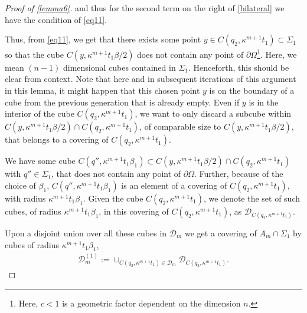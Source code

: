 \documentclass{article}
\newcounter{lem}
\theoremstyle{plain}
\theoremstyle{plain}
\newcommand{\en}{\beta_1}
\theoremstyle{definition}
\theoremstyle{plain}
\begin{document}
\begin{proof}[Proof of \cref{lemma6}]
and thus for the second term on the right of \cref{bilateral} we have the condition of \cref{eq11}. 



Thus, from \cref{eq11}, we get that there exists some point $y\in  C(q_2,\kappa^{m+1} t_1)\subset \Sigma_1$ so that the cube $C(y,\kappa^{m+1} t_1 \beta/2)$ does not contain any point of $\partial\Omega$\footnote{Here, $c<1$ is a geometric factor dependent on the dimension $n$.}. Here, we mean $(n-1)$ dimensional cubes contained in $\Sigma_1$. Henceforth, this should be clear from context. Note that here and in subsequent iterations of this argument in this lemma, it might happen that this chosen point $y$ is on the boundary of a cube from the previous generation that is already empty. Even if $y$ is in the interior of the cube $C(q_2,\kappa^{m+1}t_1)$, we want to only discard a subcube within $C(y,\kappa^{m+1} t_1 \beta/2)\cap C(q_2,\kappa^{m+1}t_1)$, of comparable size to $C(y,\kappa^{m+1} t_1 \beta/2)$, that belongs to a covering of $C(q_2,\kappa^{m+1} t_1)$.

We have some cube $C(q'', \kappa^{m+1} t_1 \en)\subset C(y,\kappa^{m+1} t_1 \beta/2)\cap C(q_2,\kappa^{m+1}t_1)$ with $q''\in \Sigma_1$, that does not contain any point of $\partial\Omega$. Further, because of the choice of $\en$, $ C(q'', \kappa^{m+1} t_1 \en)$ is an element of a covering of $C(q_2,\kappa^{m+1}t_1)$, with radius $\kappa^{m+1}t_1 \en$. Given the cube $C(q_2,\kappa^{m+1} t_1)$, we denote the set of such cubes, of radius $\kappa^{m+1}t_1 \en$, in this covering of $C(q_2,\kappa^{m+1} t_1)$, as $\mathcal{D}_{C(q_2,\kappa^{m+1} t_1)}$.

Upon a disjoint union over all these cubes in $\mathcal{D}_m$ we get a covering of $A_m \cap \Sigma_1$ by cubes of radius $\kappa^{m+1} t_1 \en$,
 \begin{align}
     \mathcal{D}_{m}^{(1)}:=\cup_{C(q_2,\kappa^{m+1}t_1)\in \mathcal{D}_m}\mathcal{D}_{C(q_2,\kappa^{m+1}t_1)}.
 \end{align}


\end{proof}
\end{document}
